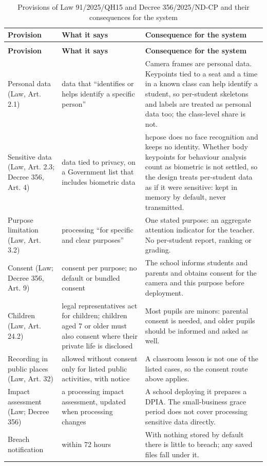 \begingroup\small
\begin{xltabular}{\textwidth}{*{3}{>{\raggedright\arraybackslash}X}}
\caption{Provisions of Law 91/2025/QH15 and Decree 356/2025/ND-CP and their consequences for the system}\label{tab:provisions-of-law-91-2025-qh15-and-decre}\\
\toprule
\textbf{Provision} & \textbf{What it says} & \textbf{Consequence for the system} \\
\midrule
\endfirsthead
{}\\
\toprule
\textbf{Provision} & \textbf{What it says} & \textbf{Consequence for the system} \\
\midrule
\endhead
\bottomrule
\endlastfoot
Personal data (Law, Art. 2.1) & data that ``identifies or helps identify a specific person'' & Camera frames are personal data. Keypoints tied to a seat and a time in a known class can help identify a student, so per-student skeletons and labels are treated as personal data too; the class-level share is not. \\
Sensitive data (Law, Art. 2.3; Decree 356, Art. 4) & data tied to privacy, on a Government list that includes biometric data & hcpose does no face recognition and keeps no identity. Whether body keypoints for behaviour analysis count as biometric is not settled, so the design treats per-student data as if it were sensitive: kept in memory by default, never transmitted. \\
Purpose limitation (Law, Art. 3.2) & processing ``for specific and clear purposes'' & One stated purpose: an aggregate attention indicator for the teacher. No per-student report, ranking or grading. \\
Consent (Law; Decree 356, Art. 9) & consent per purpose; no default or bundled consent & The school informs students and parents and obtains consent for the camera and this purpose before deployment. \\
Children (Law, Art. 24.2) & legal representatives act for children; children aged 7 or older must also consent where their private life is disclosed & Most pupils are minors: parental consent is needed, and older pupils should be informed and asked as well. \\
Recording in public places (Law, Art. 32) & allowed without consent only for listed public activities, with notice & A classroom lesson is not one of the listed cases, so the consent route above applies. \\
Impact assessment (Law; Decree 356) & a processing impact assessment, updated when processing changes & A school deploying it prepares a DPIA. The small-business grace period does not cover processing sensitive data directly. \\
Breach notification & within 72 hours & With nothing stored by default there is little to breach; any saved files fall under it. \\
\end{xltabular}
\endgroup

